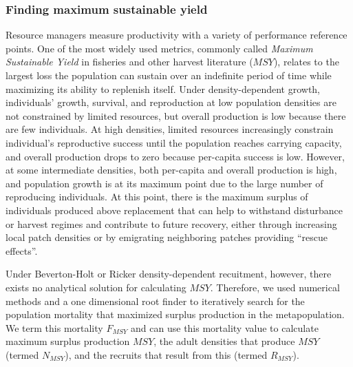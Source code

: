 \documentclass[]{article}
\begin{document}
\hypertarget{finding-maximum-sustainable-yield}{%
\subsubsection{Finding maximum sustainable
yield}\label{finding-maximum-sustainable-yield}}

Resource managers measure productivity with a variety of performance
reference points. One of the most widely used metrics, commonly called
\emph{Maximum Sustainable Yield} in fisheries and other harvest
literature (\(MSY\)), relates to the largest loss the population can
sustain over an indefinite period of time while maximizing its ability
to replenish itself. Under density-dependent growth, individuals'
growth, survival, and reproduction at low population densities are not
constrained by limited resources, but overall production is low because
there are few individuals. At high densities, limited resources
increasingly constrain individual's reproductive success until the
population reaches carrying capacity, and overall production drops to
zero because per-capita success is low. However, at some intermediate
densities, both per-capita and overall production is high, and
population growth is at its maximum point due to the large number of
reproducing individuals. At this point, there is the maximum surplus of
individuals produced above replacement that can help to withstand
disturbance or harvest regimes and contribute to future recovery, either
through increasing local patch densities or by emigrating neighboring
patches providing ``rescue effects''.

Under Beverton-Holt or Ricker density-dependent recuitment, however,
there exists no analytical solution for calculating \(MSY\). Therefore,
we used numerical methods and a one dimensional root finder to
iteratively search for the population mortality that maximized surplus
production in the metapopulation. We term this mortality \(F_{MSY}\) and
can use this mortality value to calculate maximum surplus production
\(MSY\), the adult densities that produce \(MSY\) (termed \(N_{MSY}\)),
and the recruits that result from this (termed \(R_{MSY}\)).
\end{document}
